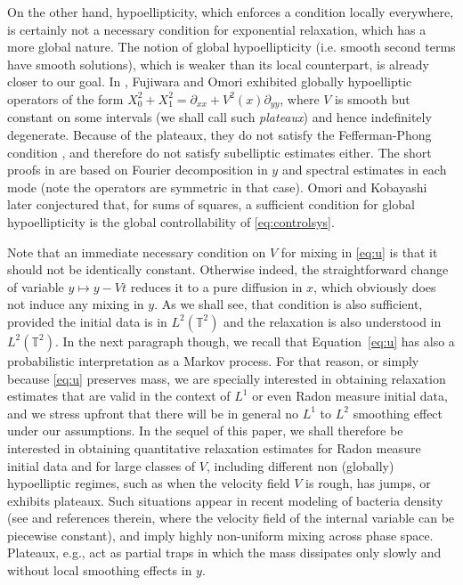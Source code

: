 \documentclass[12pt]{article}
\newcommand{\T}{\mathbb{T}}
\begin{document}
\smallskip

On the other hand, hypoellipticity, which enforces a condition 
locally everywhere, is certainly not a necessary condition for 
exponential relaxation, which has a more 
global nature. The notion of global hypoellipticity (i.e. smooth 
second terms have smooth solutions), which is weaker than its 
local counterpart, is already closer to our goal. In  
\cite{FujOmo83}, Fujiwara and Omori exhibited  
globally hypoelliptic operators of the form $X_0^2 + X_1^2 = 
\partial_{xx} + V^2(x)\partial_{yy}$, where $V$ is smooth but 
constant on some intervals (we shall call such {\it plateaux}) and hence 
indefinitely degenerate. Because of the plateaux, they do not satisfy
the Fefferman-Phong condition 
\cite{FefPho83}, and therefore do not satisfy subelliptic
estimates either. The short proofs in \cite{FujOmo83} are 
based on Fourier decomposition in $y$ and spectral estimates in each mode (note 
the operators are symmetric in that case). Omori and Kobayashi \cite{OmoKob99}  
later conjectured that, for sums of squares, a sufficient condition for 
global hypoellipticity is the global controllability of \eqref{eq:controlsys}.  

\medskip

Note that an immediate necessary condition on $V$ for mixing 
in \eqref{eq:u} is that it should not be identically constant. 
Otherwise indeed, the  straightforward change of variable 
$y \mapsto y - Vt$ reduces it to a pure diffusion in $x$, which 
obviously does not induce any mixing in $y.$ As we shall see,  
that condition is also sufficient, provided the initial data is in 
$L^2(\T^2)$ and the relaxation is also understood in $L^2(\T^2)$.  
In the next paragraph though, we recall that Equation~\eqref{eq:u} 
has also a probabilistic interpretation as a Markov process. For that 
reason, or simply because \eqref{eq:u} preserves mass, we are  
specially interested in obtaining relaxation estimates that are valid in 
the context of $L^1$ or even Radon measure initial data, and we stress 
upfront that there will be in general no $L^1$ to $L^2$ smoothing 
effect under our assumptions.
In the sequel of this paper, we shall therefore be  
interested in obtaining quantitative relaxation estimates 
for Radon measure initial data and for large classes of $V$, including 
different non (globally) hypoelliptic regimes, such as when the 
velocity field $V$ is rough, has jumps, or exhibits plateaux.
Such situations appear in recent modeling of bacteria density 
(see \cite{JLT2025} and references therein, where the velocity field 
of the internal variable can be piecewise constant), and imply 
highly non-uniform  mixing across phase space. Plateaux, e.g., act as partial traps in 
which the mass dissipates only slowly and without local smoothing 
effects in $y$. 
\end{document}
